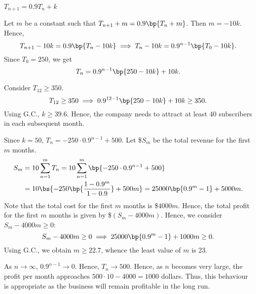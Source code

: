 \begin{solution}
    \begin{ppart}
        $T_{n+1} = 0.9T_n + k$
    \end{ppart}
    \begin{ppart}
        Let $m$ be a constant such that $T_{n+1} + m = 0.9\bp{T_n + m}$. Then $m = -10k$. Hence, \[T_{n+1} - 10k = 0.9\bp{T_n - 10k} \implies T_{n} - 10k = 0.9^{n-1} \bp{T_0 - 10k}.\] Since $T_0 = 250$, we get \[T_n = 0.9^{n-1} \bp{250 - 10k} + 10k.\]
    \end{ppart}
    \begin{ppart}
        Consider $T_{12} \geq 350$. \[T_{12} \geq 350 \implies 0.9^{12-1} \bp{250 - 10k} + 10k \geq 350.\] Using G.C., $k \geq 39.6$. Hence, the company needs to attract at least 40 subscribers in each subsequent month.
    \end{ppart}
    \begin{ppart}
        Since $k = 50$, $T_n = -250 \cdot 0.9^{n-1} + 500$. Let \$$S_m$ be the total revenue for the first $m$ months.
        \begin{align*}
            S_m &= 10 \sum_{n=1}^m T_n = 10 \sum_{n=1}^m \bp{-250 \cdot 0.9^{n-1} + 500}\\
            &= 10\bs{-250 \bp{\frac{1 - 0.9^{m}}{1 - 0.9}} + 500m} = 25000 \bp{0.9^m - 1} + 5000m.
        \end{align*}
        Note that the total cost for the first $m$ months is \$$4000m$. Hence, the total profit for the first $m$ months is given by \$$(S_m - 4000m)$. Hence, we consider $S_m - 4000m \geq 0$: \[S_m - 4000m \geq 0 \implies 25000\bp{0.9^m - 1} + 1000m \geq 0.\] Using G.C., we obtain $m \geq 22.7$, whence the least value of $m$ is 23.
    \end{ppart}
    \begin{ppart}
        As $n \to \infty$, $0.9^{n-1} \to 0$. Hence, $T_n \to 500$. Hence, as $n$ becomes very large, the profit per month approaches $500 \cdot 10 - 4000 = 1000$ dollars. Thus, this behaviour is appropriate as the business will remain profitable in the long run.
    \end{ppart}
\end{solution}